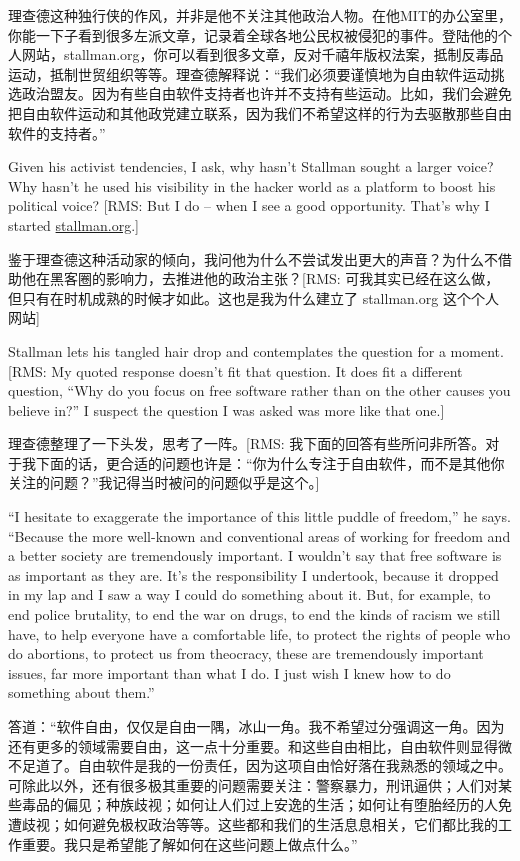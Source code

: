 \ifdefined\chs
理查德这种独行侠的作风，并非是他不关注其他政治人物。在他MIT的办公室里，你能一下子看到很多左派文章，记录着全球各地公民权被侵犯的事件。登陆他的个人网站，stallman.org，你可以看到很多文章，反对千禧年版权法案，抵制反毒品运动，抵制世贸组织等等。理查德解释说：“我们必须要谨慎地为自由软件运动挑选政治盟友。因为有些自由软件支持者也许并不支持有些运动。比如，我们会避免把自由软件运动和其他政党建立联系，因为我们不希望这样的行为去驱散那些自由软件的支持者。”
\fi

\ifdefined\eng
Given his activist tendencies, I ask, why hasn't Stallman sought a larger voice? Why hasn't he used his visibility in the hacker world as a platform to boost his political voice?  [RMS: But I do -- when I see a good opportunity.  That's why I started \url{stallman.org}.]
\fi

\ifdefined\chs
鉴于理查德这种活动家的倾向，我问他为什么不尝试发出更大的声音？为什么不借助他在黑客圈的影响力，去推进他的政治主张？[RMS: 可我其实已经在这么做，但只有在时机成熟的时候才如此。这也是我为什么建立了 stallman.org 这个个人网站]
\fi

\ifdefined\eng
Stallman lets his tangled hair drop and contemplates the question for a moment. [RMS:  My quoted response doesn't fit that question.  It does fit a different question, ``Why do you focus on free software rather than on the other causes you believe in?''  I suspect the question I was asked was more like that one.]
\fi

\ifdefined\chs
理查德整理了一下头发，思考了一阵。[RMS: 我下面的回答有些所问非所答。对于我下面的话，更合适的问题也许是：“你为什么专注于自由软件，而不是其他你关注的问题？”我记得当时被问的问题似乎是这个。]
\fi

\ifdefined\eng
``I hesitate to exaggerate the importance of this little puddle of freedom,'' he says. ``Because the more well-known and conventional areas of working for freedom and a better society are tremendously important. I wouldn't say that free software is as important as they are. It's the responsibility I undertook, because it dropped in my lap and I saw a way I could do something about it. But, for example, to end police brutality, to end the war on drugs, to end the kinds of racism we still have, to help everyone have a comfortable life, to protect the rights of people who do abortions, to protect us from theocracy, these are tremendously important issues, far more important than what I do. I just wish I knew how to do something about them.''
\fi

\ifdefined\chs
答道：“软件自由，仅仅是自由一隅，冰山一角。我不希望过分强调这一角。因为还有更多的领域需要自由，这一点十分重要。和这些自由相比，自由软件则显得微不足道了。自由软件是我的一份责任，因为这项自由恰好落在我熟悉的领域之中。可除此以外，还有很多极其重要的问题需要关注：警察暴力，刑讯逼供；人们对某些毒品的偏见；种族歧视；如何让人们过上安逸的生活；如何让有堕胎经历的人免遭歧视；如何避免极权政治等等。这些都和我们的生活息息相关，它们都比我的工作重要。我只是希望能了解如何在这些问题上做点什么。”
\fi

